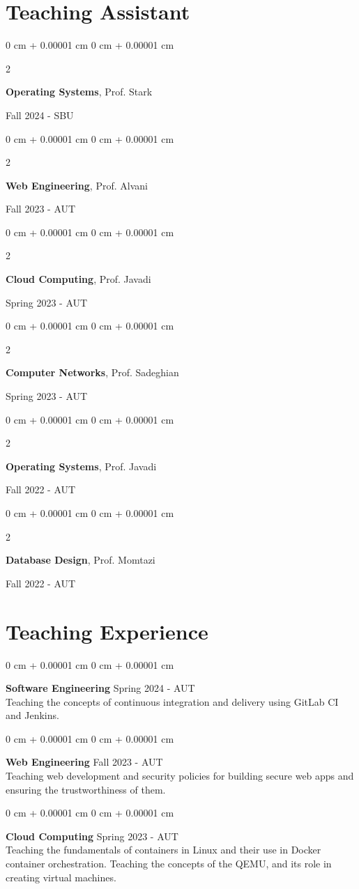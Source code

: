 \documentclass[10pt, letterpaper]{article}
\newenvironment{onecolentry}{
    \begin{adjustwidth}{
        0 cm + 0.00001 cm
    }{
        0 cm + 0.00001 cm
    }
}{
    \end{adjustwidth}
} %
\newenvironment{twocolentry}[2][]{
    \onecolentry
    \def\secondColumn{#2}
    \setcolumnwidth{\fill, 4.5 cm}
    \begin{paracol}{2}
}{
    \switchcolumn \raggedleft \secondColumn
    \end{paracol}
    \endonecolentry
} %
\begin{document}
    \section{Teaching Assistant}
        \begin{twocolentry}{Fall 2024 - SBU}
            \textbf{Operating Systems}, Prof. Stark
        \end{twocolentry}
        \vspace{0.1 cm}
        \begin{twocolentry}{Fall 2023 - AUT}
            \textbf{Web Engineering}, Prof. Alvani
        \end{twocolentry}
        \vspace{0.1 cm}
        \begin{twocolentry}{Spring 2023 - AUT}
            \textbf{Cloud Computing}, Prof. Javadi
        \end{twocolentry}
        \vspace{0.1 cm}
        \begin{twocolentry}{Spring 2023 - AUT}
            \textbf{Computer Networks}, Prof. Sadeghian
        \end{twocolentry}
        \vspace{0.1 cm}
        \begin{twocolentry}{Fall 2022 - AUT}
            \textbf{Operating Systems}, Prof. Javadi
        \end{twocolentry}
        \vspace{0.1 cm}
        \begin{twocolentry}{Fall 2022 - AUT}
            \textbf{Database Design}, Prof. Momtazi
        \end{twocolentry}

    \section{Teaching Experience}
        \begin{onecolentry}
            \textbf{Software Engineering} \hfill Spring 2024 - AUT\\
            Teaching the concepts of continuous integration and delivery using GitLab CI and Jenkins.
        \end{onecolentry}
        \vspace{0.15 cm}
        \begin{onecolentry} 
            \textbf{Web Engineering} \hfill Fall 2023 - AUT\\
            Teaching web development and security policies for building secure web apps and ensuring the trustworthiness of them.
        \end{onecolentry}
        \vspace{0.15 cm}
        \begin{onecolentry}
            \textbf{Cloud Computing} \hfill Spring 2023 - AUT\\
            Teaching the fundamentals of containers in Linux and their use in Docker container orchestration. Teaching the concepts of the QEMU, and its role in creating virtual machines.
        \end{onecolentry}
\end{document}
